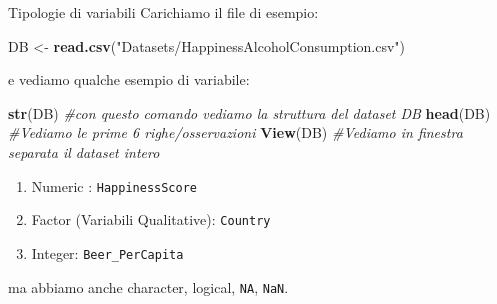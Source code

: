 \documentclass[
  ignorenonframetext,
]{beamer}
\newenvironment{Shaded}{\begin{snugshade}}{\end{snugshade}}
\newcommand{\CommentTok}[1]{\textcolor[rgb]{0.56,0.35,0.01}{\textit{#1}}}
\newcommand{\KeywordTok}[1]{\textcolor[rgb]{0.13,0.29,0.53}{\textbf{#1}}}
\newcommand{\NormalTok}[1]{#1}
\newcommand{\StringTok}[1]{\textcolor[rgb]{0.31,0.60,0.02}{#1}}
\begin{document}
\begin{frame}[fragile]{Tipologie di variabili}
\protect\hypertarget{tipologie-di-variabili}{}
Carichiamo il file di esempio:

\begin{Shaded}
\begin{Highlighting}[]
\NormalTok{DB \textless{}{-}}\StringTok{ }\KeywordTok{read.csv}\NormalTok{(}\StringTok{"Datasets/HappinessAlcoholConsumption.csv"}\NormalTok{)}
\end{Highlighting}
\end{Shaded}

e vediamo qualche esempio di variabile:

\begin{Shaded}
\begin{Highlighting}[]
\KeywordTok{str}\NormalTok{(DB) }\CommentTok{\#con questo comando vediamo la struttura del dataset DB}
\KeywordTok{head}\NormalTok{(DB) }\CommentTok{\#Vediamo le prime 6 righe/osservazioni}
\KeywordTok{View}\NormalTok{(DB) }\CommentTok{\#Vediamo in finestra separata il dataset intero}
\end{Highlighting}
\end{Shaded}

\begin{enumerate}
\item
  Numeric : \texttt{HappinessScore}
\item
  Factor (Variabili Qualitative): \texttt{Country}
\item
  Integer: \texttt{Beer\_PerCapita}
\end{enumerate}

ma abbiamo anche character, logical, \texttt{NA}, \texttt{NaN}.
\end{frame}
\end{document}
